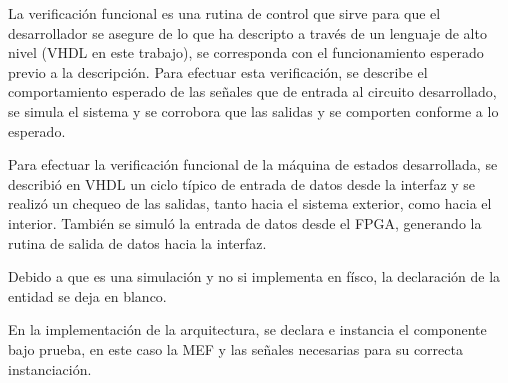 La verificación funcional es una rutina de control que sirve para que el desarrollador se asegure de lo que ha descripto a través de un lenguaje de alto nivel (VHDL en este trabajo), se corresponda con el funcionamiento esperado previo a la descripción. Para efectuar esta verificación, se describe el comportamiento esperado de las señales que de entrada al circuito desarrollado, se simula el sistema y se corrobora que las salidas y se comporten conforme a lo esperado.

Para efectuar la verificación funcional de la máquina de estados desarrollada, se describió en VHDL un ciclo típico de entrada de datos desde la interfaz y se realizó un chequeo de las salidas, tanto hacia el sistema exterior, como hacia el interior. También se simuló la entrada de datos desde el FPGA, generando la rutina de salida de datos hacia la interfaz.

Debido a que es una simulación y no si implementa en físco, la declaración de la entidad se deja en blanco.
%

En la implementación de la arquitectura, se declara e instancia el componente bajo prueba, en este caso la MEF y las señales necesarias para su correcta instanciación.

%
% 
% 
%    
%
%
%
%
 
